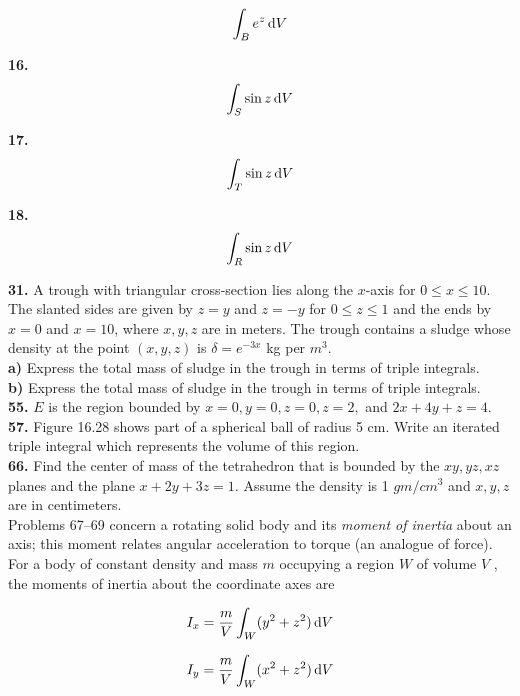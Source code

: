 \documentclass[11pt]{report}
\begin{document}
\[ \int _B e^z \, \text dV \]

\textbf{16.} \\

\[ \int _S \sin{z} \, \text dV \]

\textbf{17.} \\

\[ \int _T \sin{z} \, \text dV \]

\textbf{18.} \\

\[ \int _R \sin{z} \, \text dV \]

\textbf{31.} A trough with triangular cross-section lies along the $x$-axis for
$0 \leq x \leq 10$. The slanted sides are given by $z = y$ and $z = -y$ for
$0 \leq z \leq 1$ and the ends by $x = 0$ and $x = 10$, where $x, y, z$ are in meters.
The trough contains a sludge whose density at the point $(x, y, z)$ is
$\delta = e^{-3x}$ kg per $m^3$. \\

\textbf{a)} Express the total mass of sludge in the trough in terms of triple
integrals. \\

\textbf{b)} Express the total mass of sludge in the trough in terms of triple
integrals. \\

\textbf{55.} $E$ is the region bounded by $x = 0, y = 0, z = 0, z = 2,$
and $2x + 4y + z = 4$. \\

\textbf{57.} Figure 16.28 shows part of a spherical ball of radius 5 cm.
Write an iterated triple integral which represents the volume of this region. \\

\textbf{66.} Find the center of mass of the tetrahedron that is bounded by the
$xy, yz, xz$ planes and the plane $x + 2y + 3z = 1$. Assume the density is
1 $gm/cm^3$ and $x, y, z$ are in centimeters. \\

Problems 67–69 concern a rotating solid body and its \textit{moment of inertia}
about an axis; this moment relates angular acceleration to torque (an analogue
of force). For a body of constant density and mass $m$ occupying a region $W$
of volume $V$ , the moments of inertia about the coordinate axes are

\[I_x = \frac{m}{V} \int _W (y^2 + z^2) \, \text d V \]

\[I_y = \frac{m}{V} \int _W (x^2 + z^2) \, \text d V \]
\end{document}
